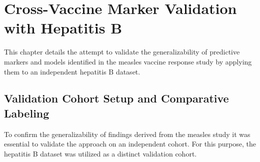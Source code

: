 \documentclass[12pt,a4paper]{report}
\newcommand{\todo}[1]{%
  \par\noindent%
  \begin{tcolorbox}[colback=yellow, colframe=black, boxrule=0.5pt, sharp corners, width=\linewidth, before skip=5pt, after skip=5pt]
    \textbf{TODO:} #1
  \end{tcolorbox}%
  \par
}
\begin{document}









\chapter{Cross-Vaccine Marker Validation with Hepatitis B}


\noindent
This chapter details the attempt to validate the generalizability of predictive markers and models identified in the measles vaccine response study by applying them to an independent hepatitis B dataset.

\section{Validation Cohort Setup and Comparative Labeling}
\noindent
To confirm the generalizability of findings derived from the measles study it was essential to validate the approach on an independent cohort. For this purpose, the hepatitis B dataset was utilized as a distinct validation cohort.\\
\end{document}
